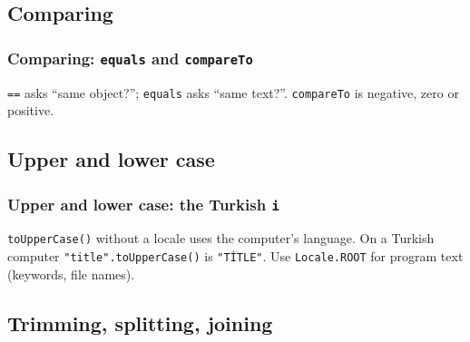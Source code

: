 \documentclass[aspectratio=169,10pt,compress]{beamer}
\begin{document}
\subsection[Compare]{Comparing}




\begin{frame}[t,fragile] \frametitle{Comparing: \texttt{equals} and \texttt{compareTo}}

  \vspace{0.3em}
  \small \texttt{==} asks ``same object?''; \texttt{equals} asks ``same text?''. \texttt{compareTo} is negative, zero or positive.
\end{frame}




\subsection[Case]{Upper and lower case}




\begin{frame}[t,fragile] \frametitle{Upper and lower case: the Turkish \texttt{i}}

  \vspace{0.3em}
  \small {} \texttt{toUpperCase()} without a locale uses the computer's language. On a Turkish
  computer \texttt{"title".toUpperCase()} is \texttt{"TİTLE"}. Use \texttt{Locale.ROOT} for program text (keywords, file names).
\end{frame}




\subsection[Transform]{Trimming, splitting, joining}
\end{document}
